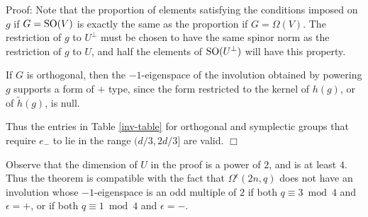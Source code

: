 \documentclass[12pt]{article}
\newenvironment{proof}{\normalsize {\sc Proof}:}{{\hfill $\Box$ \\}}
\def\SO{{\rm SO}}
\begin{document}
\begin{proof}
Note that the proportion of elements satisfying the conditions 
imposed on $g$ if $G=\SO(V)$ is exactly the same
as the proportion if $G=\Omega(V)$.  The restriction of 
$g$ to $U^\perp$ must be chosen to have the same 
spinor norm as the restriction of $g$ to
$U$, and half the elements of $\SO(U^\perp)$ will have this property.

If $G$ is orthogonal, then the $-1$-eigenspace of the 
involution obtained by powering $g$ supports a form of
$+$ type, since the form restricted to the kernel of $h(g)$, 
or of $\tilde{h}(g)$, is null.  

Thus the entries in Table \ref{inv-table} 
for orthogonal and symplectic groups 
that require $e_-$ to lie in the range $(d/3,2d/3]$ are valid.
\end{proof}

Observe that the dimension of $U$ in the proof 
is a power of $2$, and is at least $4$.  Thus the theorem is 
compatible with the fact that
$\Omega^\epsilon(2n,q)$ does not have an involution whose 
$-1$-eigenspace is an odd multiple of $2$ if both 
$q\equiv3\bmod4$ and $\epsilon=+$,
or if both $q\equiv1\bmod4$ and $\epsilon=-$.  

\end{document}
